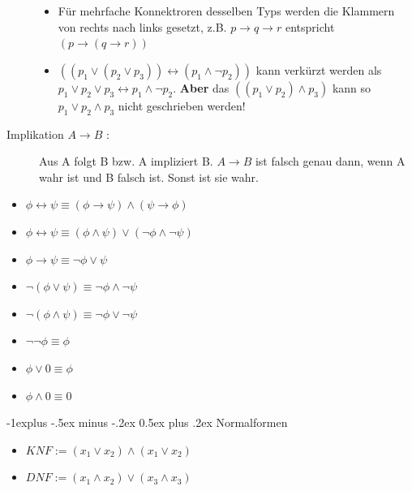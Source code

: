 \documentclass[8pt,landscape]{article}
\makeatletter
\renewcommand{\subsection}{\@startsection{subsection}{2}{0mm}%
                                {-1explus -.5ex minus -.2ex}%
                                {0.5ex plus .2ex}%
                                {\normalfont\normalsize\bfseries}}
\makeatother
\begin{document}
\begin{multicols}{3}
\begin{description}
\begin{itemize}
    \item F\"ur mehrfache Konnektroren desselben Typs werden die Klammern von rechts nach links gesetzt, z.B. $ p \rightarrow q \rightarrow r $ entspricht $ (p \rightarrow (q \rightarrow r)) $
    \item $ ((p_{1} \vee (p_{2} \vee p_{3})) \leftrightarrow (p_{1} \wedge \neg p_{2})) $ kann verk\"urzt werden als $ p_{1} \vee p_{2} \vee p_{3} \leftrightarrow p_{1} \wedge \neg p_{2} $. \textbf{Aber} das $ (( p_{1} \vee p_{2}) \wedge p_{3}) $ kann so $ p_{1} \vee p_{2} \wedge p_{3} $ nicht geschrieben werden!
    \end{itemize}
  \item[Implikation $ A \rightarrow B $ :] Aus A folgt B bzw. A impliziert B. $ A \rightarrow B $ ist falsch genau dann, wenn A wahr ist und B falsch ist. Sonst ist sie wahr.
\end{description}


\begin{itemize}
\item $ \phi \leftrightarrow \psi \equiv ( \phi \rightarrow \psi ) \wedge ( \psi \rightarrow \phi ) $
\item $ \phi \leftrightarrow \psi \equiv ( \phi \wedge \psi ) \vee (\neg \phi \wedge \neg \psi) $
\item $ \phi \rightarrow \psi \equiv \neg \phi \vee \psi $
\item $ \neg ( \phi \vee \psi ) \equiv \neg \phi \wedge \neg \psi $
\item $ \neg ( \phi \wedge \psi ) \equiv \neg \phi \vee \neg \psi $
\item $ \neg \neg \phi \equiv \phi $
\item $ \phi \vee 0 \equiv \phi $
\item $ \phi \wedge 0 \equiv 0 $
\end{itemize}

\subsection{Normalformen}
\begin{itemize}
\item $ KNF := (x_{1} \vee x_{2}) \wedge (x_{1} \vee x_{2}) $
\item $ DNF := (x_{1} \wedge x_{2} ) \vee (x_{3} \wedge x_{3}) $
\end{itemize}


\end{multicols}
\end{document}

